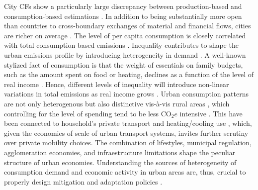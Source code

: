 \documentclass[
  10pt,
  twocolumn]{aft}
\begin{document}
City CFs show a particularly large discrepancy between production-based
and consumption-based estimations \citep{c40_future_2019}. In addition
to being substantially more open than countries to cross-boundary
exchanges of material and financial flows, cities are richer on average
\citep{wiedmann_city_2021}. The level of per capita consumption is
closely correlated with total consumption-based emissions
\citep{wiedmann_threescope_2021, lopez_how_2017, eea_environmental_2013}.
Inequality contributes to shape the urban emissions profile by
introducing heterogeneity in demand
\citep{chancelClimateInequalityReport2023, lopez_how_2017}. A well-known
stylized fact of consumption is that the weight of essentials on family
budgets, such as the amount spent on food or heating, declines as a
function of the level of real income
\citep{browningEngelLaw2018, kausEngelLawCrosscountry2013, chaiBackEngelEvidence2013}.
Hence, different levels of inequality will introduce non-linear
variations in total emissions as real income grows
\citep{levinsonEnvironmentalEngelCurves2015}. Urban consumption patterns
are not only heterogenous but also distinctive vis-à-vis rural areas
\citep{lopez_assessing_2016, wiedmann_city_2021}, which controlling for
the level of spending tend to be less \(\text{CO}_2e\) intensive
\citep{corcoles_carbon_2024, lopez_assessing_2016}. This have been
connected to household's private transport and heating/cooling use
\citep{corcoles_carbon_2024}, which, given the economies of scale of
urban transport systems, invites further scrutiny over private mobility
choices. The combination of lifestyles, municipal regulation,
agglomeration economies, and infraestructure limitations shape the
peculiar structure of urban economies. Understanding the sources of
heterogeneity of consumption demand and economic activity in urban areas
are, thus, crucial to properly design mitigation and adaptation policies
\citep{ipcc_climate_2023}.
\end{document}
